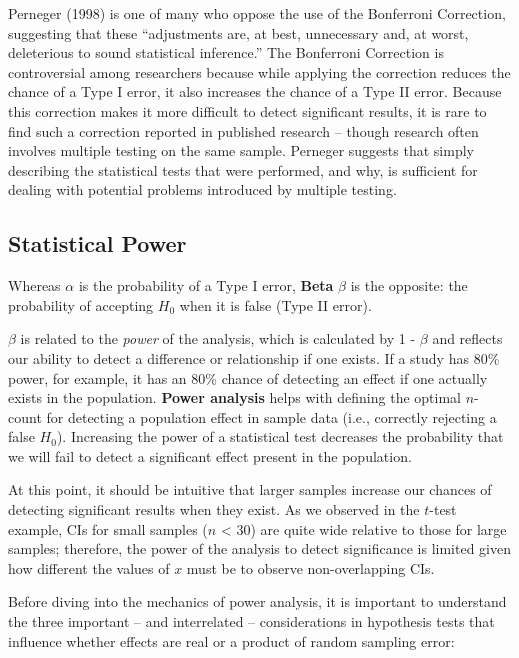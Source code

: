 \documentclass[
]{book}
\begin{document}
Perneger (1998) is one of many who oppose the use of the Bonferroni Correction, suggesting that these ``adjustments are, at best, unnecessary and, at worst, deleterious to sound statistical inference.'' The Bonferroni Correction is controversial among researchers because while applying the correction reduces the chance of a Type I error, it also increases the chance of a Type II error. Because this correction makes it more difficult to detect significant results, it is rare to find such a correction reported in published research -- though research often involves multiple testing on the same sample. Perneger suggests that simply describing the statistical tests that were performed, and why, is sufficient for dealing with potential problems introduced by multiple testing.

\hypertarget{statistical-power}{%
\subsection{Statistical Power}\label{statistical-power}}

Whereas \(\alpha\) is the probability of a Type I error, \textbf{Beta} \(\beta\) is the opposite: the probability of accepting \(H_0\) when it is false (Type II error).

\(\beta\) is related to the \emph{power} of the analysis, which is calculated by 1 - \(\beta\) and reflects our ability to detect a difference or relationship if one exists. If a study has 80\% power, for example, it has an 80\% chance of detecting an effect if one actually exists in the population. \textbf{Power analysis} helps with defining the optimal \(n\)-count for detecting a population effect in sample data (i.e., correctly rejecting a false \(H_0\)). Increasing the power of a statistical test decreases the probability that we will fail to detect a significant effect present in the population.

At this point, it should be intuitive that larger samples increase our chances of detecting significant results when they exist. As we observed in the \(t\)-test example, CIs for small samples (\(n\) \textless{} 30) are quite wide relative to those for large samples; therefore, the power of the analysis to detect significance is limited given how different the values of \(x\) must be to observe non-overlapping CIs.

Before diving into the mechanics of power analysis, it is important to understand the three important -- and interrelated -- considerations in hypothesis tests that influence whether effects are real or a product of random sampling error:
\end{document}
